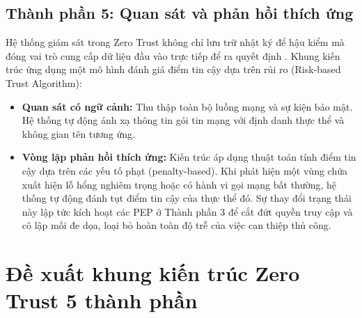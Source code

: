 \subsection{Thành phần 5: Quan sát và phản hồi thích ứng}
Hệ thống giám sát trong Zero Trust không chỉ lưu trữ nhật ký để hậu kiểm mà đóng vai trò cung cấp dữ liệu đầu vào trực tiếp để ra quyết định \parencite{nist800207}. Khung kiến trúc ứng dụng một mô hình đánh giá điểm tin cậy dựa trên rủi ro (Risk-based Trust Algorithm):
\begin{itemize}[itemsep=6pt, parsep=0pt]
    \item \textbf{Quan sát có ngữ cảnh:} Thu thập toàn bộ luồng mạng và sự kiện bảo mật. Hệ thống tự động ánh xạ thông tin gói tin mạng với định danh thực thể và không gian tên tương ứng.
    \item \textbf{Vòng lặp phản hồi thích ứng:} Kiến trúc áp dụng thuật toán tính điểm tin cậy dựa trên các yếu tố phạt (penalty-based). Khi phát hiện một vùng chứa xuất hiện lỗ hổng nghiêm trọng hoặc có hành vi gọi mạng bất thường, hệ thống tự động đánh tụt điểm tin cậy của thực thể đó. Sự thay đổi trạng thái này lập tức kích hoạt các PEP ở Thành phần 3 để cắt đứt quyền truy cập và cô lập mối đe dọa, loại bỏ hoàn toàn độ trễ của việc can thiệp thủ công.
\end{itemize}







































\section{Đề xuất khung kiến trúc Zero Trust 5 thành phần}

